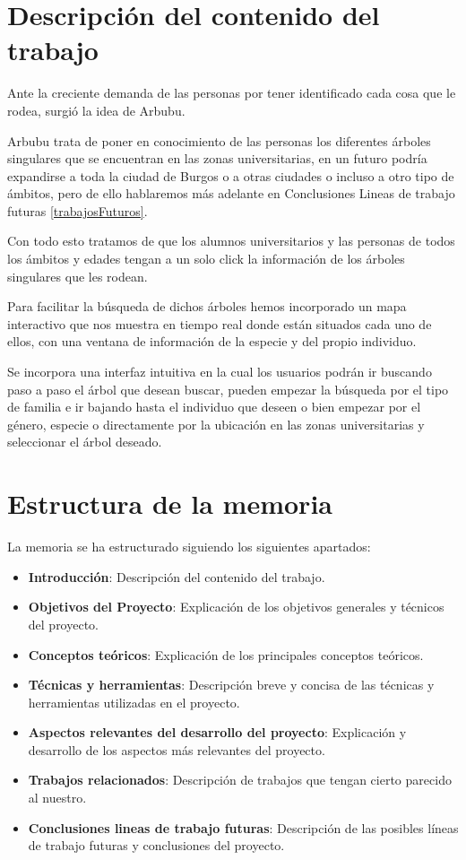 
\section{Descripción del contenido del trabajo}
Ante la creciente demanda de las personas por tener identificado cada cosa que le rodea, surgió la idea de Arbubu.

Arbubu trata de poner en conocimiento de las personas los diferentes árboles singulares que se encuentran en las zonas universitarias, en un futuro podría expandirse a toda la ciudad de Burgos o a otras ciudades o incluso a otro tipo de ámbitos, pero de ello hablaremos más adelante en Conclusiones Lineas de trabajo futuras
\ref{trabajosFuturos}. 

Con todo esto tratamos de que los alumnos universitarios y las personas de todos los ámbitos y edades tengan a un solo click la información de los árboles singulares que les rodean.

Para facilitar la búsqueda de dichos árboles hemos incorporado un mapa interactivo que nos muestra en tiempo real donde están situados cada uno de ellos, con una ventana de información de la especie y del propio individuo.

Se incorpora una interfaz intuitiva en la cual los usuarios podrán ir buscando paso a paso el árbol que desean buscar, pueden empezar la búsqueda por el tipo de familia e ir bajando hasta el individuo que deseen o bien empezar por el género, especie o directamente por la ubicación en las zonas universitarias y seleccionar el árbol deseado.
\newpage


\section{Estructura de la memoria}
La memoria se ha estructurado siguiendo los siguientes apartados:
\begin{itemize}
	\item \textbf{Introducción}: Descripción del contenido del trabajo.
	\item \textbf{Objetivos del Proyecto}: Explicación de los objetivos generales y técnicos del proyecto.
	\item \textbf{Conceptos teóricos}: Explicación de los principales conceptos teóricos.
	\item \textbf{Técnicas y herramientas}: Descripción breve y concisa de las técnicas y herramientas utilizadas en el proyecto.
	\item \textbf{Aspectos relevantes del desarrollo del proyecto}: Explicación y desarrollo de los aspectos más relevantes del proyecto.
	\item \textbf{Trabajos relacionados}: Descripción de trabajos que tengan cierto parecido al nuestro.
	\item \textbf{Conclusiones lineas de trabajo futuras}: Descripción de las posibles líneas de trabajo futuras y conclusiones del proyecto.
\end{itemize}

